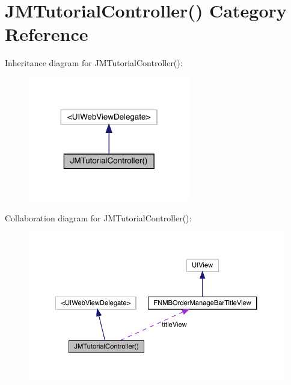 \hypertarget{category_j_m_tutorial_controller_07_08}{}\section{J\+M\+Tutorial\+Controller() Category Reference}
\label{category_j_m_tutorial_controller_07_08}


Inheritance diagram for J\+M\+Tutorial\+Controller()\+:\nopagebreak
\begin{figure}[H]
\begin{center}
\leavevmode
\includegraphics[width=200pt]{category_j_m_tutorial_controller_07_08__inherit__graph}
\end{center}
\end{figure}


Collaboration diagram for J\+M\+Tutorial\+Controller()\+:\nopagebreak
\begin{figure}[H]
\begin{center}
\leavevmode
\includegraphics[width=350pt]{category_j_m_tutorial_controller_07_08__coll__graph}
\end{center}
\end{figure}
